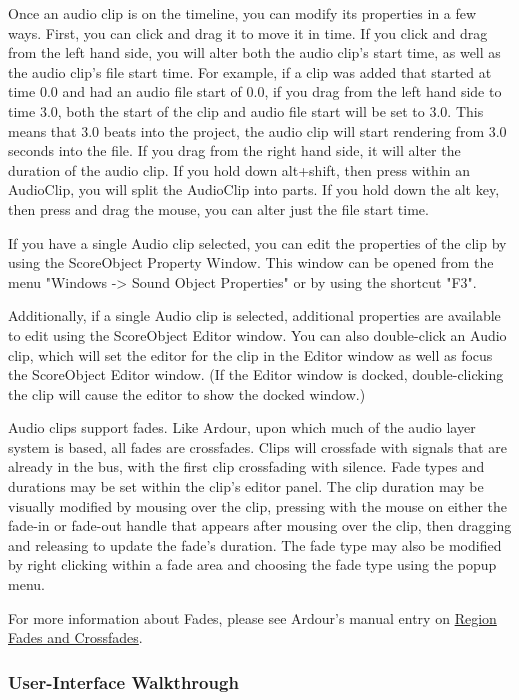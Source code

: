 Once an audio clip is on the timeline, you can modify its properties in
a few ways. First, you can click and drag it to move it in time. If you
click and drag from the left hand side, you will alter both the audio
clip's start time, as well as the audio clip's file start time. For
example, if a clip was added that started at time 0.0 and had an audio
file start of 0.0, if you drag from the left hand side to time 3.0, both
the start of the clip and audio file start will be set to 3.0. This
means that 3.0 beats into the project, the audio clip will start
rendering from 3.0 seconds into the file. If you drag from the right
hand side, it will alter the duration of the audio clip. If you hold
down alt+shift, then press within an AudioClip, you will split the
AudioClip into parts. If you hold down the alt key, then press and drag
the mouse, you can alter just the file start time.

If you have a single Audio clip selected, you can edit the properties of
the clip by using the ScoreObject Property Window. This window can be
opened from the menu "Windows -\textgreater{} Sound Object Properties"
or by using the shortcut "F3".

Additionally, if a single Audio clip is selected, additional properties
are available to edit using the ScoreObject Editor window. You can also
double-click an Audio clip, which will set the editor for the clip in
the Editor window as well as focus the ScoreObject Editor window. (If
the Editor window is docked, double-clicking the clip will cause the
editor to show the docked window.)

Audio clips support fades. Like Ardour, upon which much of the audio
layer system is based, all fades are crossfades. Clips will crossfade
with signals that are already in the bus, with the first clip
crossfading with silence. Fade types and durations may be set within the
clip's editor panel. The clip duration may be visually modified by
mousing over the clip, pressing with the mouse on either the fade-in or
fade-out handle that appears after mousing over the clip, then dragging
and releasing to update the fade's duration. The fade type may also be
modified by right clicking within a fade area and choosing the fade type
using the popup menu.

For more information about Fades, please see Ardour's manual entry on
\href{http://manual.ardour.org/editing-and-arranging/create-region-fades-and-crossfades/}{Region
Fades and Crossfades}.

\subsubsection{User-Interface Walkthrough}


